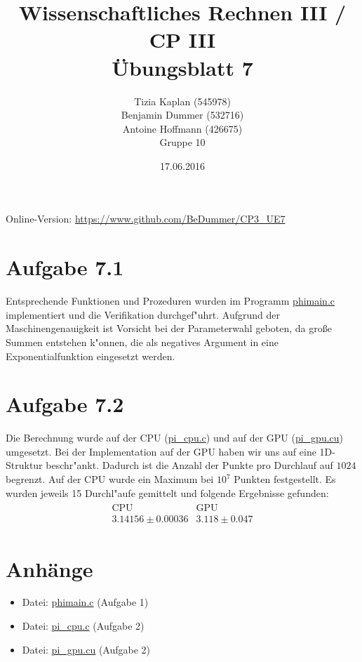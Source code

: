\documentclass[%
	paper=A4,	%
	pagesize,	%
	DIV=calc,	%
	smallheadings,	%
	ngerman		%
]{scrartcl}
\title{{\bf Wissenschaftliches Rechnen III / CP III}\\Übungsblatt 7}
\author{Tizia Kaplan (545978)\\Benjamin Dummer (532716)\\Antoine Hoffmann (426675)\\Gruppe 10}
\date{17.06.2016}
\begin{document}
\maketitle
Online-Version: \href{https://www.github.com/BeDummer/CP3_UE7}{\url{https://www.github.com/BeDummer/CP3_UE7}}

\section*{Aufgabe 7.1}
Entsprechende Funktionen und Prozeduren wurden im Programm \url{phimain.c} implementiert und die Verifikation durchgef"uhrt. Aufgrund der Maschinengenauigkeit ist Vorsicht bei der Parameterwahl geboten, da gro\ss e Summen entstehen k"onnen, die als negatives Argument in eine Exponentialfunktion eingesetzt werden.

\section*{Aufgabe 7.2}
Die Berechnung wurde auf der CPU (\url{pi_cpu.c}) und auf der GPU (\url{pi_gpu.cu}) umgesetzt.
Bei der Implementation auf der GPU haben wir uns auf eine 1D-Struktur beschr"ankt. Dadurch ist die Anzahl der Punkte pro Durchlauf auf $1024$ begrenzt. Auf der CPU wurde ein Maximum bei $10^7$ Punkten festgestellt. Es wurden jeweils 15 Durchl"aufe gemittelt und folgende Ergebnisse gefunden:
\begin{eqnarray} \nonumber
	\begin{array}{c|c}
 \mbox{CPU} & \mbox{GPU}\\ \hline
3.14156 \pm 0.00036 & 3.118 \pm 0.047  
	\end{array}
\end{eqnarray}

\section*{Anhänge}
\begin{itemize}
	\item Datei: \url{phimain.c} (Aufgabe 1)
	\item Datei: \url{pi_cpu.c} (Aufgabe 2)
	\item Datei: \url{pi_gpu.cu} (Aufgabe 2)
\end{itemize}
\end{document}
